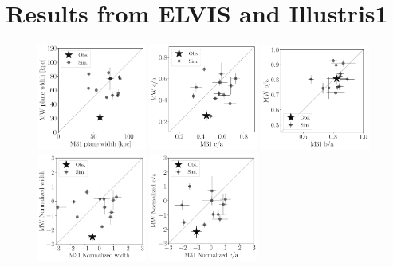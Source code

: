 \documentclass[a4paper,fleqn,usenatbib]{mnras}
\begin{document}
\section{Results from ELVIS and Illustris1}
\begin{figure}
\centering
\includegraphics[width=0.32\textwidth]{scatter_ranked_elvis_width.pdf}
\includegraphics[width=0.32\textwidth]{scatter_ranked_elvis_ca_ratio.pdf}
\includegraphics[width=0.32\textwidth]{scatter_ranked_elvis_ba_ratio.pdf}
\includegraphics[width=0.32\textwidth]{scatter_norm_ranked_elvis_width.pdf}
\includegraphics[width=0.32\textwidth]{scatter_norm_ranked_elvis_ca_ratio.pdf}

\end{figure}
\end{document}
